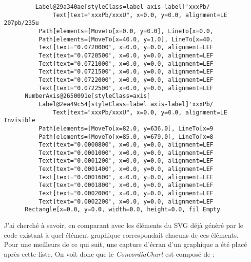 \begin{verbatim}
         Label@29a340ae[styleClass=label axis-label]'xxxPb/
              Text[text="xxxPb/xxxU", x=0.0, y=0.0, alignment=LE 207pb/235u
          Path[elements=[MoveTo[x=0.0, y=0.0], LineTo[x=0.0, 
          Path[elements=[MoveTo[x=40.0, y=1.0], LineTo[x=40. 
          Text[text="0.0720000", x=0.0, y=0.0, alignment=LEF
          Text[text="0.0720500", x=0.0, y=0.0, alignment=LEF
          Text[text="0.0721000", x=0.0, y=0.0, alignment=LEF
          Text[text="0.0721500", x=0.0, y=0.0, alignment=LEF
          Text[text="0.0722000", x=0.0, y=0.0, alignment=LEF
          Text[text="0.0722500", x=0.0, y=0.0, alignment=LEF
      NumberAxis@2650091e[styleClass=axis]
          Label@2ea49c54[styleClass=label axis-label]'xxxPb/
              Text[text="xxxPb/xxxU", x=0.0, y=0.0, alignment=LE Invisible
          Path[elements=[MoveTo[x=82.0, y=636.0], LineTo[x=9
          Path[elements=[MoveTo[x=85.0, y=679.0], LineTo[x=8
          Text[text="0.0000800", x=0.0, y=0.0, alignment=LEF
          Text[text="0.0001000", x=0.0, y=0.0, alignment=LEF
          Text[text="0.0001200", x=0.0, y=0.0, alignment=LEF
          Text[text="0.0001400", x=0.0, y=0.0, alignment=LEF
          Text[text="0.0001600", x=0.0, y=0.0, alignment=LEF
          Text[text="0.0001800", x=0.0, y=0.0, alignment=LEF
          Text[text="0.0002000", x=0.0, y=0.0, alignment=LEF
          Text[text="0.0002200", x=0.0, y=0.0, alignment=LEF
      Rectangle[x=0.0, y=0.0, width=0.0, height=0.0, fil Empty
\end{verbatim}
J'ai cherché à savoir, en comparant avec les éléments du SVG déjà génèré par le code existant à quel élément graphique correspondait chacuns de ces éléments. Pour une meilleurs de ce qui suit, une capture d'écran d'un graphique a été placé après cette liste. On voit donc que le \textit{ConcordiaChart} est composé de :
